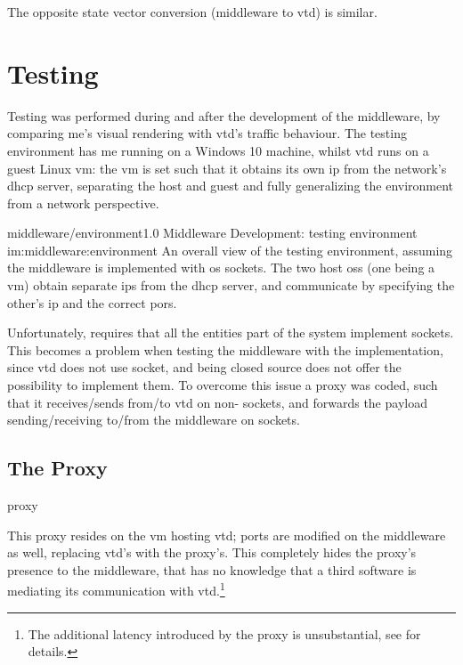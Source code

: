The opposite state vector conversion (\gls{middleware} to \gls{vtd}) is similar.

\section{Testing}\label{sc:middleware:testing}

Testing was performed during and after the development of the \gls{middleware}, by comparing \gls{me}'s visual rendering with \gls{vtd}'s traffic behaviour. The testing environment has \gls{me} running on a Windows 10 machine, whilst \gls{vtd} runs on a guest Linux \gls{vm}: the \gls{vm} is set such that it obtains its own \gls{ip} from the network's \gls{dhcp} server, separating the host and guest and fully generalizing the environment from a network perspective.

\begin{image}
	{middleware/environment}{1.0}
	{Middleware Development: testing environment}
	{im:middleware:environment}
	{}
	{An overall view of the testing environment, assuming the \gls{middleware} is implemented with \gls{os} sockets. The two host \glspl{os} (one being a \gls{vm}) obtain separate \glspl{ip} from the \gls{dhcp} server, and communicate by specifying the other's \gls{ip} and the correct pors.}
\end{image}

Unfortunately,  requires that all the entities part of the system implement  sockets. This becomes a problem when testing the \gls{middleware} with the  implementation, since \gls{vtd} does not use  socket, and being closed source does not offer the possibility to implement them. To overcome this issue a \gls{proxy} was coded, such that it receives/sends from/to \gls{vtd} on non- sockets, and forwards the \gls{payload} sending/receiving to/from the \gls{middleware} on  sockets.

\subsection{The Proxy}

\begin{definition}{proxy}
\end{definition}

This \gls{proxy} resides on the \gls{vm} hosting \gls{vtd}; ports are modified on the \gls{middleware} as well, replacing \gls{vtd}'s with the \gls{proxy}'s. This completely hides the \gls{proxy}'s presence to the \gls{middleware}, that has no knowledge that a third software is mediating its communication with \gls{vtd}.\footnote{The additional latency introduced by the \gls{proxy} is unsubstantial, see  for details.}

